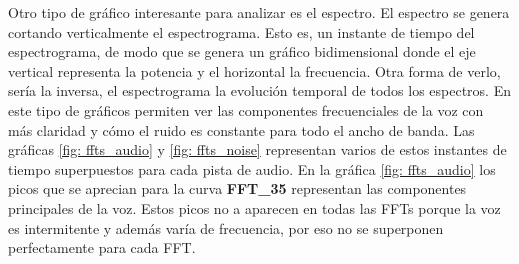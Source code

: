 Otro tipo de gráfico interesante para analizar es el espectro. El espectro se genera cortando verticalmente el espectrograma. Esto es, un instante de tiempo del espectrograma, de modo que se genera un gráfico bidimensional donde el eje vertical representa la potencia y el horizontal la frecuencia. Otra forma de verlo, sería la inversa, el espectrograma la evolución temporal de todos los espectros. En este tipo de gráficos permiten ver las componentes frecuenciales de la voz con más claridad y cómo el ruido es constante para todo el ancho de banda. Las gráficas \ref{fig: ffts_audio} y \ref{fig: ffts_noise} representan varios de estos instantes de tiempo superpuestos para cada pista de audio. En la gráfica \ref{fig: ffts_audio} los picos que se aprecian para la curva \textbf{FFT\_35} representan las componentes principales de la voz. Estos picos no a aparecen en todas las \glspl{FFT} porque la voz es intermitente y además varía de frecuencia, por eso no se superponen perfectamente para cada \gls{FFT}.

